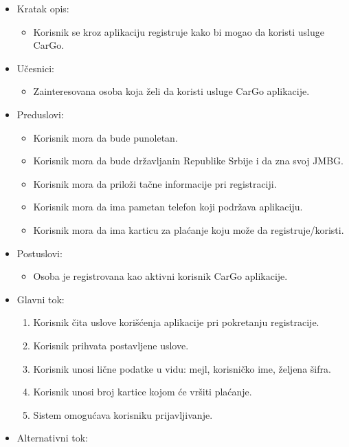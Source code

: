 \begin{itemize}
    \item Kratak opis:
        \begin{itemize}
            \item Korisnik se kroz aplikaciju registruje kako bi mogao da koristi usluge CarGo.
        \end{itemize}
    \item Učesnici:
        \begin{itemize}
            \item Zainteresovana osoba koja želi da koristi usluge CarGo aplikacije.
        \end{itemize}
    \item Preduslovi:
        \begin{itemize}
            \item Korisnik mora da bude punoletan.
            \item Korisnik mora da bude državljanin Republike Srbije i da zna svoj JMBG.
            \item Korisnik mora da priloži tačne informacije pri registraciji.
            \item Korisnik mora da ima pametan telefon koji podržava aplikaciju.
            \item Korisnik mora da ima karticu za plaćanje koju može da registruje/koristi.
        \end{itemize}
    \item Postuslovi:
        \begin{itemize}
            \item Osoba je registrovana kao aktivni korisnik CarGo aplikacije.
        \end{itemize}
    \item Glavni tok:
        \begin{enumerate}
            \item Korisnik čita uslove korišćenja aplikacije pri pokretanju registracije.
            \item Korisnik prihvata postavljene uslove.
            \item Korisnik unosi lične podatke u vidu: mejl, korisničko ime, željena šifra.
            \item Korisnik unosi broj kartice kojom će vršiti plaćanje.
            \item Sistem omogućava korisniku prijavljivanje.
        \end{enumerate}
    \item Alternativni tok:

\end{itemize}
